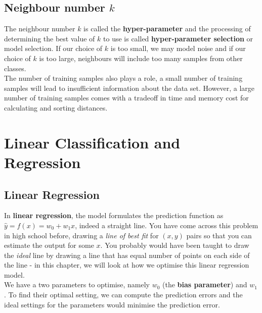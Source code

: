 \documentclass[11pt,fleqn]{book} %
\begin{document}
\section{Neighbour number $k$}
The neighbour number $k$ is called the \textbf{hyper-parameter} and the processing of determining the best value of $k$ to use is called \textbf{hyper-parameter selection} or model selection. If our choice of $k$ is too small, we may model noise and if our choice of $k$ is too large, neighbours will include too many samples from other classes.\\

\noindent
The number of training samples also plays a role, a small number of training samples will lead to insufficient information about the data set. However, a large number of training samples comes with a tradeoff in time and memory cost for calculating and sorting distances.



\chapter{Linear Classification and Regression}

\section{Linear Regression}
In \textbf{linear regression}, the model formulates the prediction function as $\hat{y} = f(x) = w_0 + w_1x$, indeed a straight line. You have come across this problem in high school before, drawing a \textit{line of best fit} for $(x, y)$ pairs so that you can estimate the output for some $x$. You probably would have been taught to draw the \textit{ideal} line by drawing a line that has equal number of points on each side of the line - in this chapter, we will look at how we optimise this linear regression model.\\

\noindent
We have a two parameters to optimise, namely $w_0$ (the \textbf{bias parameter}) and $w_1$. To find their optimal setting, we can compute the prediction errors and the ideal settings for the parameters would minimise the prediction error.
\end{document}
